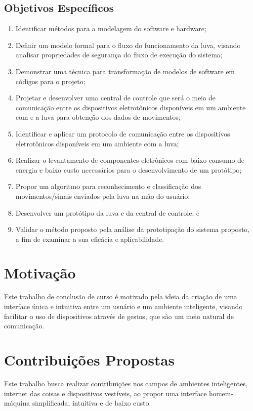\subsection{Objetivos Específicos}
\begin{enumerate}
    \item Identificar métodos para a modelagem do software e hardware;
    \item Definir um modelo formal para o fluxo do funcionamento da luva, visando analisar propriedades de segurança do fluxo de execução do sistema;
    \item Demonstrar uma técnica para transformação de modelos de software em códigos para o projeto;
    \item Projetar e desenvolver uma central de controle que será o meio de comunicação entre os dispositivos eletrotônicos disponíveis em um ambiente com e a luva para obtenção dos dados de movimentos;
    \item Identificar e aplicar um protocolo de comunicação entre os dispositivos eletrotônicos disponíveis em um ambiente com a luva;
    \item Realizar o levantamento de componentes eletrônicos com baixo consumo de energia e baixo custo necessários para o desenvolvimento de um protótipo;    
    \item Propor um algoritmo para reconhecimento e classificação dos movimentos/sinais enviados pela luva na mão do usuário;
    \item Desenvolver um protótipo da luva e da central de controle; e
    \item Validar o método proposto pela análise da prototipação do sistema proposto, a fim de examinar a sua eficácia e aplicabilidade. 
\end{enumerate}



\section{Motivação}

Este trabalho de conclusão de curso é motivado pela ideia da criação de uma interface única e intuitiva entre um usuário e um ambiente inteligente, visando facilitar o uso de dispositivos através de gestos, que são um meio natural de comunicação.



\section{Contribuições Propostas}

Este trabalho busca realizar contribuições nos campos de ambientes inteligentes, internet das coisas e dispositivos vestíveis, ao propor uma interface homem-máquina simplificada, intuitiva e de baixo custo. 
